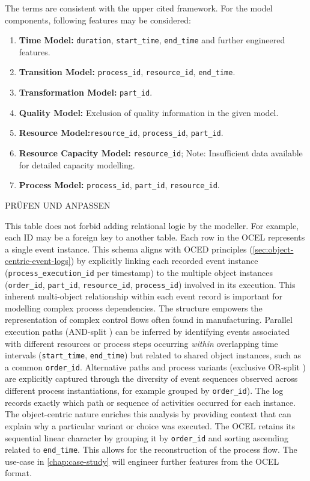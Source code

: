 The terms are consistent with the upper cited framework. For the model components, following features may be considered:

\begin{enumerate}
  \item \textbf{Time Model:} \texttt{duration}, \texttt{start\_time}, \texttt{end\_time} and further engineered features.

  \item \textbf{Transition Model:} \texttt{process\_id}, \texttt{resource\_id}, \texttt{end\_time}.

  \item \textbf{Transformation Model:} \texttt{part\_id}.

  \item \textbf{Quality Model:} Exclusion of quality information in the given model.

  \item \textbf{Resource Model:}\texttt{resource\_id}, \texttt{process\_id}, \texttt{part\_id}.

  \item \textbf{Resource Capacity Model:} \texttt{resource\_id}; Note: Insufficient data available for detailed capacity modelling.

  \item \textbf{Process Model:} \texttt{process\_id}, \texttt{part\_id}, \texttt{resource\_id}.
\end{enumerate} PRÜFEN UND ANPASSEN

This table does not forbid adding relational logic by the modeller. For example, each ID may be a foreign key to another table. Each row in the OCEL represents a single event instance. This schema aligns with OCED principles (\autoref{sec:object-centric-event-logs}) by explicitly linking each recorded event instance (\texttt{process\_execution\_id} per timestamp) to the multiple object instances (\texttt{order\_id}, \texttt{part\_id}, \texttt{resource\_id}, \texttt{process\_id}) involved in its execution. This inherent multi-object relationship within each event record is important for modelling complex process dependencies. The structure empowers the representation of complex control flows often found in manufacturing. Parallel execution paths (AND-split \wedge) can be inferred by identifying events associated with different resources or process steps occurring \textit{within} overlapping time intervals (\texttt{start\_time}, \texttt{end\_time}) but related to shared object instances, such as a common \texttt{order\_id}. Alternative paths and process variants (exclusive OR-split \oplus) are explicitly captured through the diversity of event sequences observed across different process instantiations, for example grouped by \texttt{order\_id}). The log records exactly which path or sequence of activities occurred for each instance. The object-centric nature enriches this analysis by providing context that can explain why a particular variant or choice was executed. The OCEL retains its sequential linear character by grouping it by \texttt{order\_id} and sorting ascending related to \texttt{end\_time}. This allows for the reconstruction of the process flow. The use-case in \autoref{chap:case-study} will engineer further features from the OCEL format.

